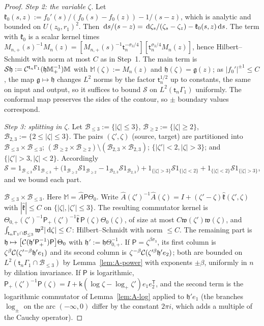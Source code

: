 \begin{proof}
\emph{Step 2: the variable $\zeta$.} Let $\mathfrak k_0(s,z):=f_0'(s)/(f_0(s)-f_0(z))-1/(s-z)$, which is analytic and
bounded on $U(z_0,r_1)^2$. Then $\,\mathrm{d} s/(s-z)=\,\mathrm{d}\zeta_s/(\zeta_s-\zeta_z)-\mathfrak k_0(s,z)\,\mathrm{d} s$. The term with
$\mathfrak k_0$ is a scalar kernel times $M_{n,+}(s)^{-1}M_n(z)=[M_{n,+}(s)^{-1}\mathsf t_n^{-\sigma_3/4}][\mathsf t_n^{\sigma_3/4}M_n(z)]$,
hence Hilbert--Schmidt with norm at most $C$ as in Step~1. The main term is
$\mathcal S\mathfrak h:=\mathcal{C}^{\mathsf t_n\Gamma_1}(\mathfrak h\mathbb M_+^{-1})\mathbb M$ with $\mathbb M(\zeta):=M_n(z)$ and
$\mathfrak h(\zeta)=\mathfrak g(z)$; as $|f_0'|^{\pm1}\le C$, the map $\mathfrak g\mapsto\mathfrak h$ changes $L^2$ norms by
the factor $\mathsf t_n^{1/2}$ up to constants, the same on input and output, so it suffices to bound $\mathcal S$ on
$L^2(\mathsf t_n\Gamma_1)$ uniformly. The conformal map preserves the sides of the contour, so $\pm$ boundary values
correspond.

\emph{Step 3: splitting in $\zeta$.} Let $\mathcal B_{\le3}:=\{|\zeta|\le3\}$, $\mathcal B_{\ge2}:=\{|\zeta|\ge2\}$, $\mathcal B_{2,3}:=\{2\le|\zeta|\le3\}$. The pairs
$(\zeta',\zeta)$ (source, target) are partitioned into $\mathcal B_{\le3}\times\mathcal B_{\le3}$; $(\mathcal B_{\ge2}\times\mathcal B_{\ge2})\setminus(\mathcal B_{2,3}\times\mathcal B_{2,3})$;
$\{|\zeta'|<2,|\zeta|>3\}$; and $\{|\zeta'|>3,|\zeta|<2\}$. Accordingly
$\mathcal S=1_{\mathcal B_{\le3}}\mathcal S1_{\mathcal B_{\le3}}+\bigl(1_{\mathcal B_{\ge2}}\mathcal S1_{\mathcal B_{\ge2}}-1_{\mathcal B_{2,3}}\mathcal S1_{\mathcal B_{2,3}}\bigr)+1_{\{|\zeta|>3\}}\mathcal S1_{\{|\zeta|<2\}}
+1_{\{|\zeta|<2\}}\mathcal S1_{\{|\zeta|>3\}}$, and we bound each part.

\emph{$\mathcal B_{\le3}\times\mathcal B_{\le3}$.} Here $\mathbb M=\hat A\mathsf P\Theta_0$. Write $\hat A(\zeta')^{-1}\hat A(\zeta)=I+(\zeta'-\zeta)\hat{\mathfrak k}(\zeta',\zeta)$
with $|\hat{\mathfrak k}|\le C$ on $\{|\zeta|,|\zeta'|\le3\}$. The resulting commutator kernel is
$\Theta_{0,+}(\zeta')^{-1}\mathsf P_+(\zeta')^{-1}\hat{\mathfrak k}\,\mathsf P(\zeta)\Theta_0(\zeta)$, of size at most
$C\mathfrak w(\zeta')\mathfrak w(\zeta)$, and $\int_{\mathsf t_n\Gamma_1\cap\mathcal B_{\le3}}\mathfrak w^2|\,\mathrm{d}\zeta|\le C$: Hilbert--Schmidt with norm
$\le C$. The remaining part is $\mathfrak h\mapsto\bigl[\mathcal{C}(\mathfrak h'\mathsf P_+^{-1})\mathsf P\bigr]\Theta_0$ with
$\mathfrak h':=\mathfrak h\Theta_{0,+}^{-1}$. If $\mathsf P=\zeta^{\beta\sigma_3}$, its first column is
$\zeta^\beta\mathcal{C}(\zeta'^{-\beta}\mathfrak h'e_1)$ and its second column is $\zeta^{-\beta}\mathcal{C}(\zeta'^{\beta}
\mathfrak h'e_2)$; both are bounded on $L^2(\mathsf t_n\Gamma_1\cap\mathcal B_{\le3})$ by Lemma~\ref{lem:A-power} with exponents $\pm\beta$,
uniformly in $n$ by dilation invariance. If $\mathsf P$ is logarithmic,
$\mathsf P_+(\zeta')^{-1}\mathsf P(\zeta)=I+\mathsf k(\log\zeta-\log_+\zeta')e_1e_2^{\mathsf T}$, and the second term is the
logarithmic commutator of Lemma~\ref{lem:A-log} applied to $\mathfrak h'e_1$ (the branches $\log_\pm$ on the arc
$(-\infty,0)$ differ by the constant $2\pi i$, which adds a multiple of the Cauchy operator).


\end{proof}
